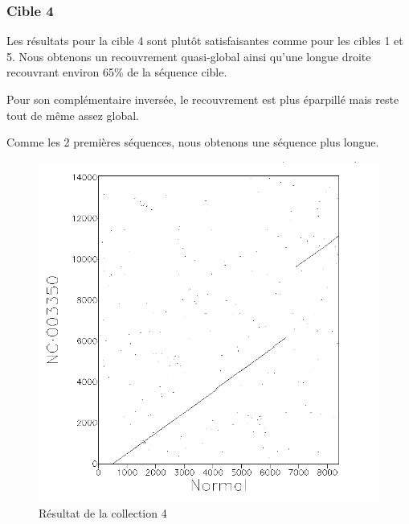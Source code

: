 \FloatBarrier

\subsubsection*{Cible 4}

Les résultats pour la cible 4 sont plutôt satisfaisantes comme pour les cibles 1
et 5. Nous obtenons un recouvrement quasi-global ainsi qu'une longue droite
recouvrant environ 65\% de la séquence cible.

Pour son complémentaire inversée, le recouvrement est plus éparpillé mais reste
tout de même assez global.

Comme les 2 premières séquences, nous obtenons une séquence plus longue.

\begin{figure}[!ht]
	\begin{minipage}[r]{.46\linewidth}
		\begin{center}
		\includegraphics[scale= 0.4]{../res/cible4.png}
		Résultat de la collection 4
	\end{center}
\end{minipage} \hfill
\begin{minipage}[c]{.46 \linewidth}
	\begin{center}

\end{center}
\end{minipage}
\end{figure}
